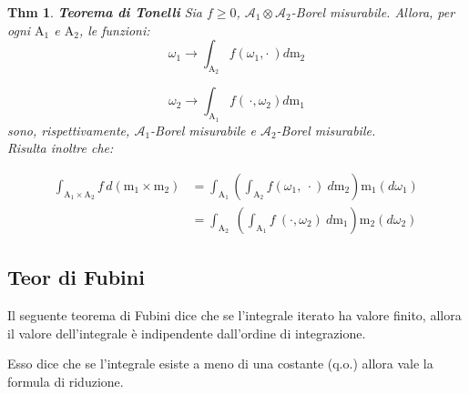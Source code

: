 \documentclass[a4paper,11pt]{article}
\theoremstyle{plain}
\newtheorem{thm}{Thm}[section]
\theoremstyle{definition}
\theoremstyle{remark}
\begin{document}
\begin{thm} \textbf{Teorema di Tonelli}
Sia $f\geq 0$, $\mathcal{A}_{1}\otimes \mathcal{A}_{2}$-Borel misurabile. Allora, per ogni $\mathrm{A}_{1}$ e $\mathrm{A}_{2}$, le funzioni:
$$
\omega_{1}\rightarrow\int_{\mathrm{A}_{2}}f(\omega_{1}, \cdot \  )d\mathrm{m}_{2}$$ 

\noindent
$$\omega_{2}\rightarrow\int_{\mathrm{A}_{1}}f( \, \cdot, \omega_{2})d\mathrm{m}_{1}
$$ 
sono, rispettivamente, $\mathcal{A}_{1}$-Borel misurabile e $\mathcal{A}_{2}$-Borel misurabile.\\
Risulta inoltre che:

\begin{align*}
\int_{\mathrm{A}_{1}\times \mathrm{A}_{2}}f \, d(\mathrm{m}_{1}\times \mathrm{m}_{2})
& =\int_{\mathrm{A}_{1}}\left (\int_{\mathrm{A}_{2}}f(\omega_{1},\ \cdot ) \ d\mathrm{m}_{2}\right)\mathrm{m}_{1} (d\omega_{1})\\
& =\int_{\mathrm{A}_{2}}\ \left(\int_{\mathrm{A}_{1}}f\ (\cdot ,\omega_{2}) \ d\mathrm{m}_{1}\right)\mathrm{m}_{2}(d\omega_{2})\ 
\end{align*}
\end{thm}

\subsection{Teor di Fubini}
Il seguente teorema di Fubini dice che se l'integrale iterato ha valore finito, allora  il valore dell'integrale è indipendente dall'ordine di integrazione.

\noindent
Esso dice che se l'integrale esiste a meno di una costante (q.o.) allora vale la formula di riduzione.
\end{document}
